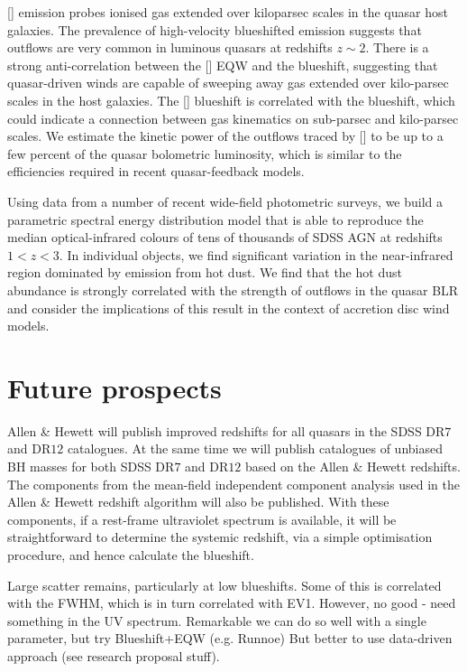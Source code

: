 [] emission probes ionised gas extended over kiloparsec scales in the quasar host galaxies. 
The prevalence of high-velocity blueshifted emission suggests that outflows are very common in luminous quasars at redshifts $z\sim2$. 
There is a strong anti-correlation between the [] EQW and the  blueshift, suggesting that quasar-driven winds are capable of sweeping away gas extended over kilo-parsec scales in the host galaxies. The [] blueshift is correlated with the  blueshift, which could indicate a connection between gas kinematics on sub-parsec and kilo-parsec scales. 
We estimate the kinetic power of the outflows traced by [] to be up to a few percent of the quasar bolometric luminosity, which is similar to the efficiencies required in recent quasar-feedback models. 

Using data from a number of recent wide-field photometric surveys, we build a parametric spectral energy distribution model that is able to reproduce the median optical-infrared colours of tens of thousands of SDSS AGN at redshifts $1 < z < 3$. 
In individual objects, we find significant variation in the near-infrared region dominated by emission from hot dust.   
We find that the hot dust abundance is strongly correlated with the strength of outflows in the quasar BLR and consider the implications of this result in the context of accretion disc wind models.

\section{Future prospects}

Allen \& Hewett will publish improved redshifts for all quasars in the SDSS DR$7$ and DR$12$ catalogues. 
At the same time we will publish catalogues of unbiased BH masses for both SDSS DR$7$ and DR$12$ based on the Allen \& Hewett redshifts. 
The components from the mean-field independent component analysis used in the Allen \& Hewett redshift algorithm will also be published.
With these components, if a rest-frame ultraviolet spectrum is available, it will be straightforward to determine the systemic redshift, via a simple optimisation procedure, and hence calculate the  blueshift. 

Large scatter remains, particularly at low  blueshifts. 
Some of this is correlated with the \ha FWHM, which is in turn correlated with EV1. 
However, no good - need something in the UV spectrum. 
Remarkable we can do so well with a single parameter, but try Blueshift+EQW (e.g. Runnoe)
But better to use data-driven approach (see research proposal stuff). 


